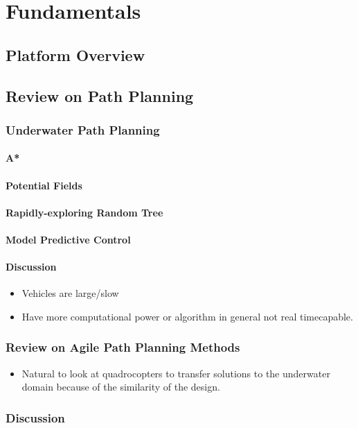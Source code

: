 \chapter{Fundamentals}

\section{Platform Overview}

\section{Review on Path Planning}
\label{sec:review-path-planning}
\subsection{Underwater Path Planning}
\label{sec:underwater-path-planning}
\subsubsection{A*}
\subsubsection{Potential Fields}
\subsubsection{Rapidly-exploring Random Tree}
\subsubsection{Model Predictive Control}
\subsubsection{Discussion}
\begin{itemize}
    \color{red}
    \item Vehicles are large/slow
    \item Have more computational power or algorithm in general not real timecapable.
\end{itemize}

\subsection{Review on Agile Path Planning Methods}
\begin{itemize}
    \color{red}
    \item Natural to look at quadrocopters to transfer solutions to the underwater domain because of the similarity of the design.
\end{itemize}
\subsection{Discussion}
